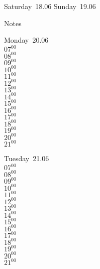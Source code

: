 \documentclass[11pt,a4paper]{book}\usepackage[]{graphicx}\usepackage[]{color}
\begin{document}
\begin{weekendbox}
  Saturday~18.06
  \tcblower
  Sunday~19.06
\end{weekendbox} %
\begin{notebox}
  Notes
\end{notebox}
\clearpage
\begin{headerbox}
\end{headerbox}
\begin{weekdaybox}
  Monday~20.06\\
  { 
  \vfill
  $07^{00}$\\
$08^{00}$\\
$09^{00}$\\
$10^{00}$\\
$11^{00}$\\
$12^{00}$\\
$13^{00}$\\
$14^{00}$\\
$15^{00}$\\
$16^{00}$\\
$17^{00}$\\
$18^{00}$\\
$19^{00}$\\
$20^{00}$\\
$21^{00}$\\
  }
\end{weekdaybox}
\begin{weekdaybox}
  Tuesday~21.06\\
  { 
  \vfill
  $07^{00}$\\
$08^{00}$\\
$09^{00}$\\
$10^{00}$\\
$11^{00}$\\
$12^{00}$\\
$13^{00}$\\
$14^{00}$\\
$15^{00}$\\
$16^{00}$\\
$17^{00}$\\
$18^{00}$\\
$19^{00}$\\
$20^{00}$\\
$21^{00}$\\
  }
\end{weekdaybox}
\end{document}
